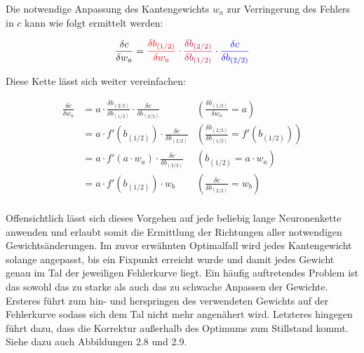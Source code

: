 Die notwendige Anpassung des Kantengewichts $w_a$ zur Verringerung des Fehlers
in $c$ kann wie folgt ermittelt werden:

\[
    \frac{\delta c}{\delta w_a}=\color{red}\frac{\delta b_{(1/2)}}{\delta w_a}\color{purple}\cdot\frac{\delta b_{(2/2)}}{\delta b_{(1/2)}}\color{blue}\cdot\frac{\delta c}{\delta b_{(2/2)}}
\]

Diese Kette lässt sich weiter vereinfachen:

\begin{align*}
    \frac{\delta c}{\delta w_a} & = a\cdot\frac{\delta b_{(2/2)}}{\delta b_{(1/2)}}\cdot\frac{\delta c}{\delta b_{(2/2)}} & \left(\frac{\delta b_{(1/2)}}{\delta w_a} =a\right)                   \\
                                & = a\cdot f'(b_{(1/2)})\cdot\frac{\delta c}{\delta b_{(2/2)}}                            & \left(\frac{\delta b_{(2/2)}}{\delta b_{(1/2)}} =f'(b_{(1/2)})\right) \\
                                & = a\cdot f'(a\cdot w_a)\cdot\frac{\delta c}{\delta b_{(2/2)}}                           & \left(b_{(1/2)} =a\cdot w_a\right)                                    \\
                                & = a\cdot f'(b_{(1/2)})\cdot w_b                                                         & \left(\frac{\delta c}{\delta b_{(2/2)}} =w_b\right)                   \\
\end{align*}

Offensichtlich lässt sich dieses Vorgehen auf jede beliebig lange Neuronenkette
anwenden und erlaubt somit die Ermittlung der Richtungen aller notwendigen
Gewichtsänderungen.
Im zuvor erwähnten Optimalfall wird jedes Kantengewicht solange angepasst,
bis ein Fixpunkt erreicht wurde und damit jedes Gewicht genau im Tal der
jeweiligen Fehlerkurve liegt. Ein häufig auftretendes Problem ist
das sowohl das zu starke als auch das zu schwache Anpassen der Gewichte.
Ersteres führt zum hin- und herspringen des verwendeten Gewichts auf der
Fehlerkurve sodass sich dem Tal nicht mehr angenähert wird.
Letzteres hingegen führt dazu, dass die Korrektur außerhalb des Optimums
zum Stillstand kommt. Siehe dazu auch Abbildungen 2.8 und 2.9.

